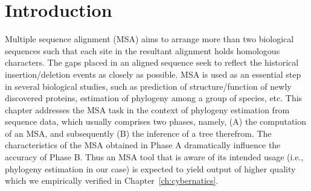 %

\section{Introduction}
\label{sec:intro}
Multiple sequence alignment (MSA) aims to arrange more than two biological sequences such that each site in the resultant alignment holds homologous characters. The gaps placed in an aligned sequence seek to reflect the historical insertion/deletion events as closely as possible. MSA is used as an essential step in several biological studies, such as prediction of structure/function of newly discovered proteins, estimation of phylogeny among a group of species, etc. This chapter addresses the MSA task in the context of phylogeny estimation from sequence data, which usually comprises two phases, namely, (A) the computation of an MSA, and subsequently (B) the inference of a tree therefrom. The characteristics of the MSA obtained in Phase A dramatically influence the accuracy of Phase B. Thus an MSA tool that is aware of its intended usage (i.e., phylogeny estimation in our case) is expected to yield output of higher quality which we empirically verified in Chapter~\ref{ch:cybernatics}.

